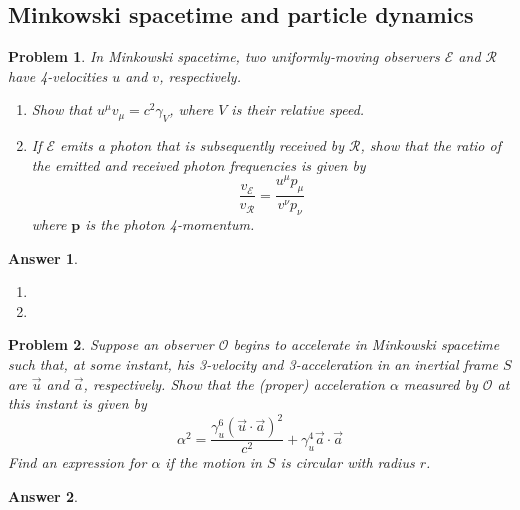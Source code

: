 \documentclass[a4paper]{article}
\newtheorem{ans}{Answer}[subsection]
\theoremstyle{new}
\newtheorem{qns}{Problem}[section]
\begin{document}
\newpage
\subsection*{Minkowski spacetime and particle dynamics}
\begin{qns}
In Minkowski spacetime, two uniformly-moving observers $\mathcal{E}$ and $\mathcal{R}$ have 4-velocities $u$ and $v$, respectively.
\begin{enumerate}[label=(\alph*)]
\item  Show that $u^\mu v_\mu=c^2\gamma_V$, where $V$ is their relative speed.
\item  If $\mathcal{E}$ emits a photon that is subsequently received by $\mathcal{R}$, show that the ratio of the emitted and received photon frequencies is given by
$$\frac{v_{\mathcal{E}}}{v_{\mathcal{R}}}=\frac{u^\mu p_\mu}{v^\nu p_\nu}$$
where $\mathbf{p}$ is the photon 4-momentum.
\end{enumerate}
\end{qns}
\begin{ans}\leavevmode
\begin{enumerate}[label=(\alph*)]
\item

\item 
\end{enumerate}
\end{ans}
\newpage
\begin{qns}
Suppose an observer $\mathcal{O}$ begins to accelerate in Minkowski spacetime such that, at some instant, his 3-velocity and 3-acceleration in an inertial frame $S$ are $\vec{u}$ and $\vec{a}$, respectively. Show that the (proper) acceleration $\alpha$ measured by $\mathcal{O}$ at this instant is given by
$$\alpha^2=\frac{\gamma_u^6(\vec{u}\cdot\vec{a})^2}{c^2}+\gamma_u^4\vec{a}\cdot\vec{a}$$
Find an expression for $\alpha$ if the motion in $S$ is circular with radius $r$. 
\end{qns}
\begin{ans}

\end{ans}
\newpage
\end{document}
